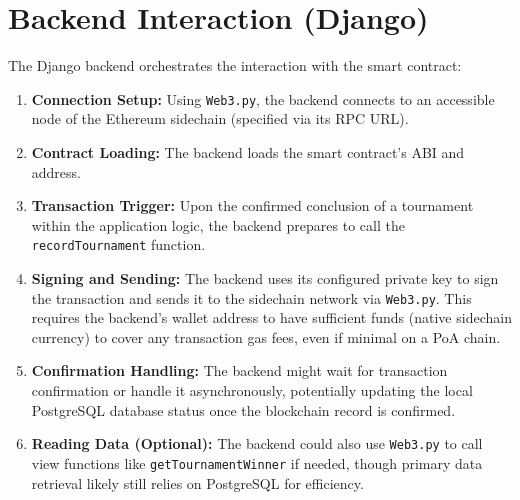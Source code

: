 \section{Backend Interaction (Django)}
\label{sec:backend_interaction}
The Django backend orchestrates the interaction with the smart contract:
\begin{enumerate}
    \item \textbf{Connection Setup:} Using \texttt{Web3.py}, the backend connects to an accessible node of the Ethereum sidechain (specified via its RPC URL).
    \item \textbf{Contract Loading:} The backend loads the smart contract's ABI and address.
    \item \textbf{Transaction Trigger:} Upon the confirmed conclusion of a tournament within the application logic, the backend prepares to call the \texttt{recordTournament} function.
    \item \textbf{Signing and Sending:} The backend uses its configured private key to sign the transaction and sends it to the sidechain network via \texttt{Web3.py}. This requires the backend's wallet address to have sufficient funds (native sidechain currency) to cover any transaction gas fees, even if minimal on a PoA chain.
    \item \textbf{Confirmation Handling:} The backend might wait for transaction confirmation or handle it asynchronously, potentially updating the local PostgreSQL database status once the blockchain record is confirmed.
    \item \textbf{Reading Data (Optional):} The backend could also use \texttt{Web3.py} to call view functions like \texttt{getTournamentWinner} if needed, though primary data retrieval likely still relies on PostgreSQL for efficiency.
\end{enumerate}


